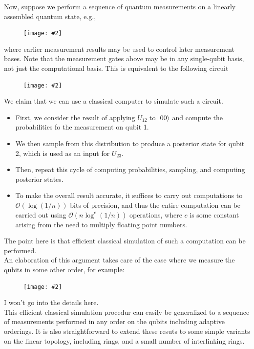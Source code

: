 \documentclass{book}
\theoremstyle{definition}
\newcommand{\fig}[2]{
	\begin{figure}[!htb]
		\centering
		\texttt{[image: \#2]}
	\end{figure}}
\begin{document}
Now, suppose we perform a sequence of quantum measurements on a linearly assembled quantum state, e.g.,
	
\fig{0.3}{linear1}
	
where earlier measurement results may be used to control later measurement bases. Note that the measurement gates above may be in any single-qubit basis, not just the
computational basis. This is equivalent to the following circuit
	
\fig{0.3}{linear2}
	
We claim that we can use a classical computer to simulate such a circuit.
\begin{itemize}
	\item First, we consider the result of applying $U_{12}$ to $\ket{00}$ and compute the probabilities fo the measurement on qubit 1.
		
	\item We then sample from this distribution to produce a posterior state for qubit 2, which is used as an input for $U_{23}$. 
		
	\item Then, repeat this cycle of computing probabilities, sampling, and computing posterior states.
		
	\item To make the overall result accurate, it suffices to carry out computations to $\mathcal{O}(\log (1/n))$ bits of precision, and thus the entire computation can be carried out using $\mathcal{O}(n \log^c(1/n))$ operations, where $c$ is some constant arising from the need to multiply floating point numbers. 
\end{itemize}

The point here is that efficient classical simulation of such a computation can be performed.\\

An elaboration of this argument takes care of the case where we measure the qubits in some other order, for example: 

\fig{0.3}{linear3}

I won't go into the details here. \\


This efficient classical simulation procedur can easily be generalized to a sequence of measurements performed in any order on the qubits including adaptive orderings. It is also straightforward to extend these resuts to some simple variants on the linear topology, including rings, and a small number of interlinking rings. \\
\end{document}
